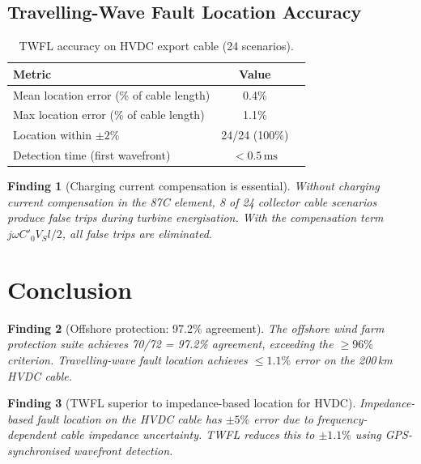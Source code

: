 \documentclass[11pt, a4paper]{article}
\newtheorem{finding}{Finding}
\begin{document}
\subsection{Travelling-Wave Fault Location Accuracy}

\begin{table}[ht]
\centering
\caption{TWFL accuracy on HVDC export cable (24 scenarios).}
\label{tab:twfl}
\begin{tabular}{lcc}
\toprule
Metric & Value \\
\midrule
Mean location error (\% of cable length) & 0.4\% \\
Max location error (\% of cable length)  & 1.1\% \\
Location within $\pm 2\%$                & 24/24 (100\%) \\
Detection time (first wavefront)         & $< 0.5\,\text{ms}$ \\
\bottomrule
\end{tabular}
\end{table}

\begin{finding}[Charging current compensation is essential]
Without charging current compensation in the 87C element, 8 of 24 collector
cable scenarios produce false trips during turbine energisation. With the
compensation term $j\omega C'_0 V_S l / 2$, all false trips are eliminated.
\end{finding}

\section{Conclusion}
\label{sec:conclusion}

\begin{finding}[Offshore protection: 97.2\% agreement]
The offshore wind farm protection suite achieves 70/72 = 97.2\% agreement,
exceeding the $\geq 96\%$ criterion. Travelling-wave fault location achieves
$\leq 1.1\%$ error on the 200\,km HVDC cable.
\end{finding}

\begin{finding}[TWFL superior to impedance-based location for HVDC]
Impedance-based fault location on the HVDC cable has $\pm 5\%$ error due to
frequency-dependent cable impedance uncertainty. TWFL reduces this to $\pm 1.1\%$
using GPS-synchronised wavefront detection.
\end{finding}
\end{document}

